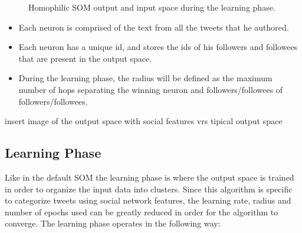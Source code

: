 \begin{figure}[htpb]
  \label{fig:homo_in_out}
  \caption{ Homophilic SOM output and input space during the learning phase. }
\end{figure}
\begin{itemize}
  \item Each neuron is comprised of the text from all the tweets that he authored.
  \item Each neuron has a unique id, and stores the ids of his followers and followees that are present in the output space.
  \item During the learning phase, the radius will be defined as the maximum number of hops separating the winning neuron and followers/followees of followers/followees. 
\end{itemize}

{\color{red} insert image of the output space with social features vrs tipical output space}

\subsection{Learning Phase}
\label{sub:learning_phase}
Like in the default \ac{SOM} the learning phase is where the output space is trained in order to organize the input data into clusters. Since this algorithm is specific to categorize tweets using social network features, the learning rate, radius and number of epochs used can be greatly reduced in order for the algorithm to converge. The learning phase operates in the following way:

